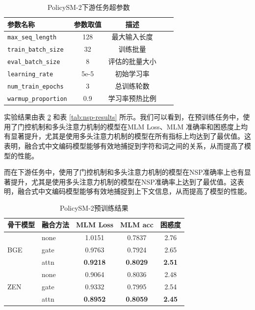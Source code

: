 \documentclass[12pt, a4paper]{ctexart}
\begin{document}
\begin{table}[H]
    \renewcommand{\arraystretch}{1}
    \centering
    \caption{PolicySM-2下游任务超参数}
    \begin{tabular}{lcccc}
        \toprule
        \textbf{参数名称} & \textbf{参数取值} & \textbf{描述} \\ 
        \midrule
        \texttt{max\_seq\_length} & 128 & 最大输入长度\\ 
        \texttt{train\_batch\_size} & 32 & 训练批量 \\ 
        \texttt{eval\_batch\_size} & 8 & 评估的批量大小 \\
        \texttt{learning\_rate} & 5e-5 & 初始学习率 \\
        \texttt{num\_train\_epochs} & 3 & 总训练轮数 \\ 
        \texttt{warmup\_proportion} & 0.9 & 学习率预热比例 \\
        \bottomrule
    \end{tabular}
    \label{tab:seqlevel_hyperparameters_2}
\end{table}

实验结果由表 \ref{tab:pretrain-results} 和表 \ref{tab:nsp-results} 所示。我们可以看到，在预训练任务中，使用了门控机制和多头注意力机制的模型在MLM Loss、MLM 准确率和困惑度上均有显著提升，尤其是使用多头注意力机制的模型在所有指标上均达到了最优值。这表明，融合式中文编码模型能够有效地捕捉到字符和词之间的关系，从而提高了模型的性能。

而在下游任务中，使用了门控机制和多头注意力机制的模型在NSP准确率上也有显著提升，尤其是使用多头注意力机制的模型在NSP准确率上达到了最优值。这表明，融合式中文编码模型能够有效地捕捉到上下文信息，从而提高了模型的性能。

\begin{table}[htbp]
    \renewcommand{\arraystretch}{1}
    \centering
    \caption{PolicySM-2预训练结果}
    \begin{tabular}{llccc}
      \toprule
      骨干模型 & 融合方法 & MLM Loss & MLM acc & 困惑度 \\
      \midrule
      \multirow{3}{*}{BGE}
        & none & 1.0151 & 0.7837 & 2.76 \\
        & gate & 0.9763 & 0.7924 & 2.65 \\
        & attn & \textbf{0.9218} & \textbf{0.8029} & \textbf{2.51} \\
      \midrule
      \multirow{3}{*}{ZEN}
        & none & 0.9064 & 0.8036 & 2.48 \\
        & gate & 0.9332 & 0.7995 & 2.54 \\
        & attn & \textbf{0.8952} & \textbf{0.8059} & \textbf{2.45} \\
      \bottomrule
    \end{tabular}
    \label{tab:pretrain-results}
  \end{table}
  
\end{document}
